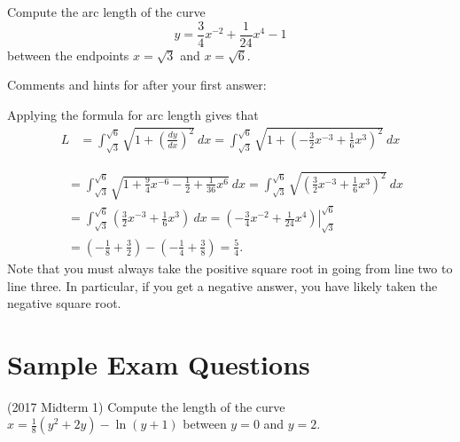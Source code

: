 \documentclass{ximera}
\begin{document}
\begin{question}%

Compute the arc length of the curve \[y = \frac{3}{4}x^{-2} + \frac{1}{24}x^{4} - 1\] between the endpoints \(x = \sqrt{3}\) and \(x = \sqrt{6}\).
\begin{multiplechoice}
\end{multiplechoice}
Comments and hints for after your first answer:
\begin{feedback}
Applying the formula for arc length gives that
\[
\begin{aligned}
L & = \int_{\sqrt{3}}^{\sqrt{6}} \sqrt{1 + \left( \frac{dy}{dx} \right)^2}~dx 
   = \int_{\sqrt{3}}^{\sqrt{6}} \sqrt{1 + \left( -\frac{3}{2}x^{-3} + \frac{1}{6}x^{3} \right)^2}~dx
\end{aligned}
\]
\begin{hint}
\[
\begin{aligned}
  & = \int_{\sqrt{3}}^{\sqrt{6}} \sqrt{1 + \frac{9}{4}x^{-6} - \frac{1}{2} + \frac{1}{36}x^{6}} ~ dx 
   = \int_{\sqrt{3}}^{\sqrt{6}} \sqrt{ \left( \frac{3}{2}x^{-3} + \frac{1}{6}x^{3} \right)^2} ~ dx \\
  & = \int_{\sqrt{3}}^{\sqrt{6}} \left( \frac{3}{2}x^{-3} + \frac{1}{6}x^{3} \right) ~ dx 
   = \left.  \left( -\frac{3}{4}x^{-2} + \frac{1}{24}x^{4} \right) \right|_{\sqrt{3}}^{\sqrt{6}} \\
  & =  \left( -\frac{1}{8} + \frac{3}{2} \right) - \left( -\frac{1}{4} + \frac{3}{8} \right) 
   = \frac{5}{4}.
\end{aligned}
\]
Note that you must always take the positive square root in going from line two to line three. In particular, if you get a negative answer, you have likely taken the negative square root.
\end{hint}
\end{feedback}

\end{question}

\section*{Sample Exam Questions}

\begin{question}(2017 Midterm 1)
Compute the length of the curve $x = \frac{1}{8} (y^2 + 2y) - \ln (y+1)$ between $y=0$ and $y = 2$.
\begin{multipleChoice}
\end{multipleChoice}
\end{question}
\end{document}
